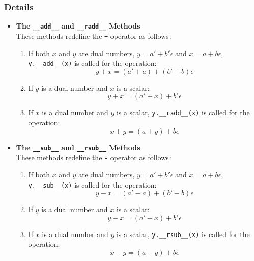 \documentclass[a4paper,12pt]{article}
\begin{document}
\subsubsection{Details}
\begin{itemize}
    \item \textbf{The \texttt{\_\_add\_\_} and \texttt{\_\_radd\_\_} Methods} \\
    These methods redefine the \texttt{+} operator as follows:
    \begin{enumerate}
        \item If both \(x\) and \(y\) are dual numbers, \(y = a' + b'\epsilon\) and \(x = a + b\epsilon\), \texttt{y.\_\_add\_\_(x)} is called for the operation:
        \[
        y + x = (a' + a) + (b' + b)\epsilon
        \]
        \item If \(y\) is a dual number and \(x\) is a scalar:
        \[
        y + x = (a' + x) + b'\epsilon
        \]
        \item If \(x\) is a dual number and \(y\) is a scalar, \texttt{y.\_\_radd\_\_(x)} is called for the operation:
        \[
        x + y = (a + y) + b\epsilon
        \]
    \end{enumerate}

    \item \textbf{The \texttt{\_\_sub\_\_} and \texttt{\_\_rsub\_\_} Methods} \\
    These methods redefine the \texttt{-} operator as follows:
    \begin{enumerate}
        \item If both \(x\) and \(y\) are dual numbers, \(y = a' + b'\epsilon\) and \(x = a + b\epsilon\), \texttt{y.\_\_sub\_\_(x)} is called for the operation:
        \[
        y - x = (a' - a) + (b' - b)\epsilon
        \]
        \item If \(y\) is a dual number and \(x\) is a scalar:
        \[
        y - x = (a' - x) + b'\epsilon
        \]
        \item If \(x\) is a dual number and \(y\) is a scalar, \texttt{y.\_\_rsub\_\_(x)} is called for the operation:
        \[
        x - y = (a - y) + b\epsilon
        \]
    \end{enumerate}


\end{itemize}
\end{document}
